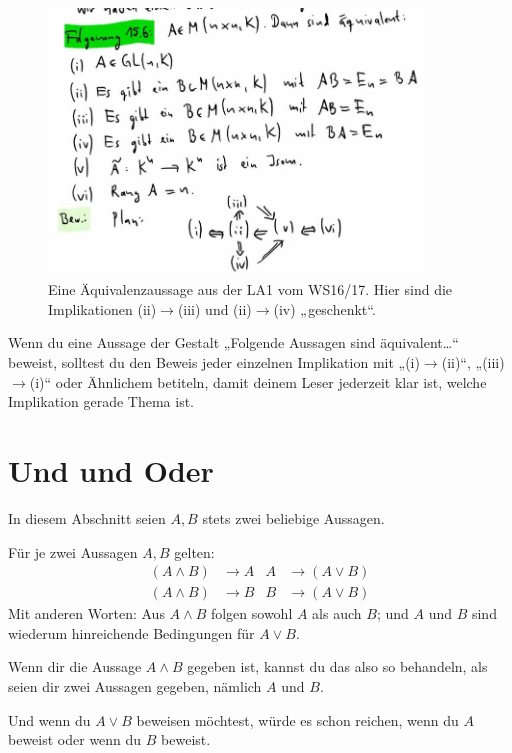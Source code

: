 \begin{bem}
    \begin{figure}[ht]
        \includegraphics[width=10cm]{./_img/equivbeweis.jpeg}
        \centering \caption{Eine Äquivalenzaussage aus der LA1 vom WS16/17. Hier sind die Implikationen (ii)$\to$(iii) und (ii)$\to$(iv) „geschenkt“.}
    \end{figure}
\end{bem}


\begin{bem}
    Wenn du eine Aussage der Gestalt „Folgende Aussagen sind äquivalent\dots“ beweist, solltest du den Beweis jeder einzelnen Implikation mit „(i)$\to$(ii)“, „(iii)$\to$(i)“ oder Ähnlichem betiteln, damit deinem Leser jederzeit klar ist, welche Implikation gerade Thema ist.
\end{bem}





\section{Und und Oder}


In diesem Abschnitt seien $A,B$ stets zwei beliebige Aussagen.


\begin{axiom}[*]\label{undoderaxiome}
    Für je zwei Aussagen $A,B$ gelten:
    \begin{align*}
        (A\land B) & \to A & A & \to (A\lor B) \\
        (A\land B) & \to B & B & \to (A\lor B)
    \end{align*}
    Mit anderen Worten: Aus $A\land B$ folgen sowohl $A$ als auch $B$; und $A$ und $B$ sind wiederum hinreichende Bedingungen für $A\lor B$.
\end{axiom}


\begin{bem}
    Wenn dir die Aussage $A\land B$ gegeben ist, kannst du das also so behandeln, als seien dir zwei Aussagen gegeben, nämlich $A$ und $B$.
    
    Und wenn du $A\lor B$ beweisen möchtest, würde es schon reichen, wenn du $A$ beweist oder wenn du $B$ beweist.
\end{bem}


